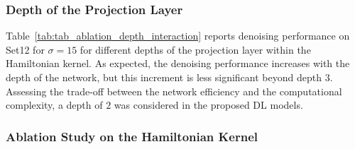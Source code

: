 \documentclass[10pt,journal,compsoc]{IEEEtran}
\begin{document}



\subsubsection{Depth of the Projection Layer}


Table~\ref{tab:tab_ablation_depth_interaction} reports denoising performance on Set12 for $\sigma = 15$ for different depths of the projection layer within the Hamiltonian kernel. As expected, the denoising performance increases with the depth of the network, but this increment is less significant beyond depth $3$. Assessing the trade-off between the network efficiency and the computational complexity, a depth of $2$ was considered in the proposed DL models.



\subsubsection{Ablation Study on the Hamiltonian Kernel}
\end{document}
